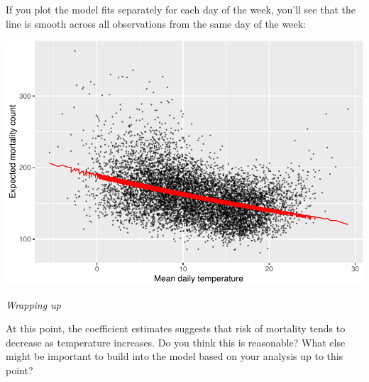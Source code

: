\documentclass[
]{book}
\newenvironment{Shaded}{\begin{snugshade}}{\end{snugshade}}
\newcommand{\AttributeTok}[1]{\textcolor[rgb]{0.77,0.63,0.00}{#1}}
\newcommand{\FloatTok}[1]{\textcolor[rgb]{0.00,0.00,0.81}{#1}}
\newcommand{\FunctionTok}[1]{\textcolor[rgb]{0.00,0.00,0.00}{#1}}
\newcommand{\NormalTok}[1]{#1}
\newcommand{\SpecialCharTok}[1]{\textcolor[rgb]{0.00,0.00,0.00}{#1}}
\newcommand{\StringTok}[1]{\textcolor[rgb]{0.31,0.60,0.02}{#1}}
\begin{document}
If you plot the model fits separately for each day of the week, you'll see that
the line is smooth across all observations from the same day of the week:

\begin{Shaded}
\end{Shaded}

\includegraphics{adv_epi_analysis_files/figure-latex/unnamed-chunk-39-1.pdf}

\emph{Wrapping up}

At this point, the coefficient estimates suggests that risk of mortality
tends to decrease as temperature increases. Do you think this is reasonable?
What else might be important to build into the model based on your analysis
up to this point?
\end{document}
